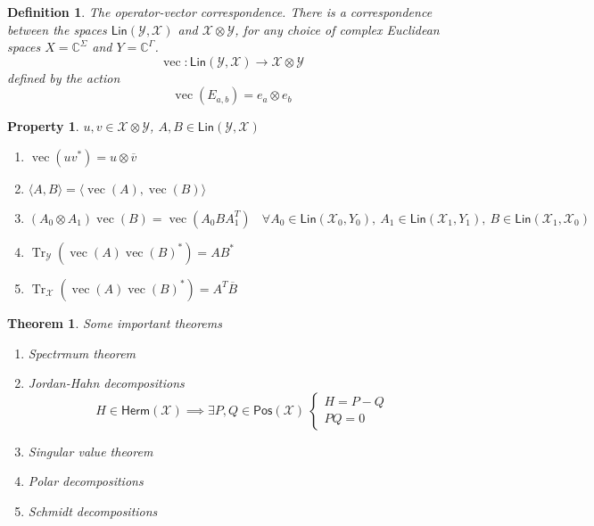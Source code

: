 \documentclass[aps,pra,onecolumn,notitlepage,superscriptaddress]{revtex4-1}
\newcommand{\C}{\mathbb{C}}
\newcommand{\spc}[1]{\mathcal{#1}}
\newcommand{\Lin}{\mathsf{Lin}}
\newcommand{\Pos}{\mathsf{Pos}}
\newcommand{\Herm}{\mathsf{Herm}}
\def\>{\rangle}
\def\<{\langle}
\newcommand{\Tr}{\operatorname{Tr}}
\newcommand{\op}[1]{\operatorname{#1}}
\newtheorem{theo}{Theorem}
\newtheorem{defi}{Definition}
\newtheorem{proper}{Property}
\begin{document}
    \begin{defi}
        The operator-vector correspondence. There is a correspondence between the spaces $\Lin(\spc Y,\spc X)$ and $\spc X \otimes \spc Y$, for any
        choice of complex Euclidean spaces $X = \C^\Sigma$ and $Y = \C^\Gamma$.
        \begin{equation}
            \op{vec} : \Lin(\spc Y,\spc X) \to \spc X \otimes \spc Y
        \end{equation}
        defined by the action
        \begin{equation}
            \op{vec}(E_{a,b}) = e_a \otimes e_b
        \end{equation}
    \end{defi}

    \begin{proper} $u,v \in \spc X \otimes \spc Y$, $A,B \in \Lin(\spc Y,\spc X)$
        \begin{enumerate}
            \item $\op{vec}(uv^*) = u \otimes \overline{v}$
            \item $\< A,B \> = \< \op{vec}(A), \op{vec}(B) \>$
            \item $(A_0 \otimes A_1) \op{vec}(B) = \op{vec}(A_0BA_1^T) \ \ \ \ \forall A_0 \in \Lin(\spc X_0,Y_0), \ A_1 \in \Lin(\spc X_1, Y_1), \ B \in \Lin(\spc X_1, \spc X_0)$
            \item $\Tr_{\spc Y}(\op{vec}(A) \op{vec}(B)^*) = AB^*$
            \item $\Tr_{\spc X}(\op{vec}(A) \op{vec}(B)^*) = A^T\overline{B}$
        \end{enumerate}
    \end{proper}

    \begin{theo}
        Some important theorems
        \begin{enumerate}
            \item Spectrmum theorem
            \item Jordan-Hahn decompositions
            \begin{equation}
                H \in \Herm(\spc X) \implies 
                \exists P,Q \in \Pos(\spc X) \
                \begin{cases}
                    H = P - Q \\
                    PQ = 0
                \end{cases}
            \end{equation}
            \item Singular value theorem
            \item Polar decompositions
            \item Schmidt decompositions
        \end{enumerate}
    \end{theo}
    
\end{document}
